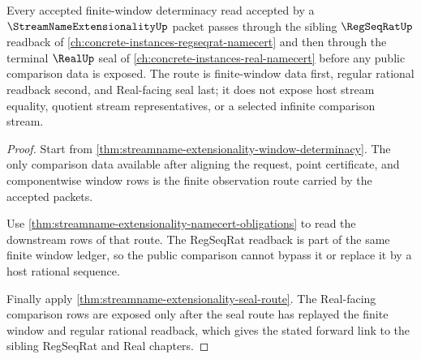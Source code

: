 \begin{theorem}
\label{thm:streamname-extensionality-regseqrat-forward-link}
Every accepted finite-window determinacy read accepted by a $\StreamNameExtensionalityUp$ packet passes through the sibling $\RegSeqRatUp$ readback of \autoref{ch:concrete-instances-regseqrat-namecert} and then through the terminal $\RealUp$ seal of \autoref{ch:concrete-instances-real-namecert} before any public comparison data is exposed. The route is finite-window data first, regular rational readback second, and Real-facing seal last; it does not expose host stream equality, quotient stream representatives, or a selected infinite comparison stream.
\end{theorem}
\begin{proof}
Start from \autoref{thm:streamname-extensionality-window-determinacy}. The only comparison data available after aligning the request, point certificate, and componentwise window rows is the finite observation route carried by the accepted packets.

Use \autoref{thm:streamname-extensionality-namecert-obligations} to read the downstream rows of that route. The RegSeqRat readback is part of the same finite window ledger, so the public comparison cannot bypass it or replace it by a host rational sequence.

Finally apply \autoref{thm:streamname-extensionality-seal-route}. The Real-facing comparison rows are exposed only after the seal route has replayed the finite window and regular rational readback, which gives the stated forward link to the sibling RegSeqRat and Real chapters.
\end{proof}

